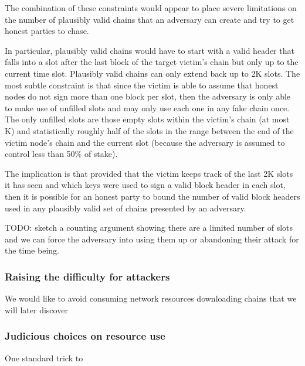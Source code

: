 \documentclass{article}
\theoremstyle{definition}{
  \newtheorem{lemma}{Lemma}[section] %
  \newtheorem{definition}[lemma]{Definition}
}
\theoremstyle{theorem}{
  \newtheorem{invariant}[lemma]{Invariant}
  \newtheorem{proofobligation}[lemma]{Proof Obligation}
}
\numberwithin{equation}{lemma}
\begin{document}
The combination of these constraints would appear to place severe limitations
on the number of plausibly valid chains that an adversary can create and try
to get honest parties to chase.

In particular, plausibly valid chains would have to start with a valid header
that falls into a slot after the last block of the target victim's chain
but only up to the current time slot. Plausibly valid chains can only extend
back up to 2K slots. The most subtle constraint is that since the victim is
able to assume that honest nodes do not sign more than one block per slot, then
the adversary is only able to make use of unfilled slots and may only use each
one in any fake chain once. The only unfilled slots are those empty slots
within the victim's chain (at most K) and statistically roughly half of the
slots in the range between the end of the victim node's chain and the current
slot (because the adversary is assumed to control less than 50\% of stake).

The implication is that provided that the victim keeps track of the last 2K
slots it has seen and which keys were used to sign a valid block header in each
slot, then it is possible for an honest party to bound the number of valid
block headers used in any plausibly valid set of chains presented by an
adversary.

TODO: sketch a counting argument showing there are a limited number of slots
and we can force the adversary into using them up or abandoning their attack
for the time being.

\subsubsection{Raising the difficulty for attackers}

We would like to avoid consuming network resources downloading chains that
we will later discover 

\subsubsection{Judicious choices on resource use}


One standard trick to 



\end{document}
